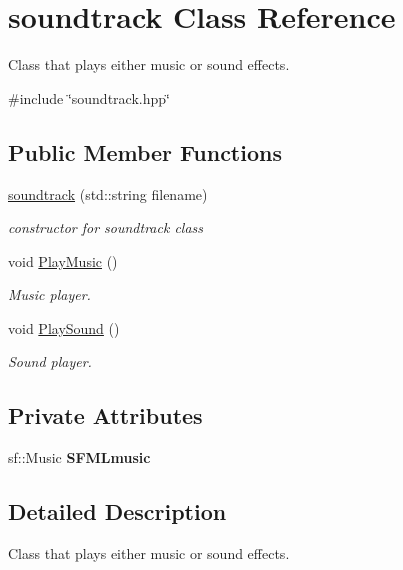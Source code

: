 \hypertarget{classsoundtrack}{}\section{soundtrack Class Reference}
\label{classsoundtrack}


Class that plays either music or sound effects.  




{\ttfamily \#include \char`\"{}soundtrack.\+hpp\char`\"{}}

\subsection*{Public Member Functions}
\begin{DoxyCompactItemize}
\item 
\hyperlink{classsoundtrack_add31bdeb1a693d541443f1d88586d3b6}{soundtrack} (std\+::string filename)
\begin{DoxyCompactList}\small\item\em constructor for soundtrack class \end{DoxyCompactList}\item 
void \hyperlink{classsoundtrack_a9bc49316f0c8607aef388728d2ca28db}{Play\+Music} ()
\begin{DoxyCompactList}\small\item\em Music player. \end{DoxyCompactList}\item 
void \hyperlink{classsoundtrack_a3c86452d68b41eea981d0df4984713e8}{Play\+Sound} ()
\begin{DoxyCompactList}\small\item\em Sound player. \end{DoxyCompactList}\end{DoxyCompactItemize}
\subsection*{Private Attributes}
\begin{DoxyCompactItemize}
\item 
\mbox{\label{classsoundtrack_ae1db63c6fe8c2f2111c693bd543e921c}} 
sf\+::\+Music {\bfseries S\+F\+M\+Lmusic}
\end{DoxyCompactItemize}


\subsection{Detailed Description}
Class that plays either music or sound effects. 

